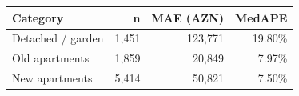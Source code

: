 \begin{tabular}{@{}lrrr@{}}
\toprule
Category & n & MAE (AZN) & MedAPE \\
\midrule
Detached / garden & 1,451 & 123,771 & 19.80\% \\
Old apartments & 1,859 & 20,849 & 7.97\% \\
New apartments & 5,414 & 50,821 & 7.50\% \\
\bottomrule
\end{tabular}

